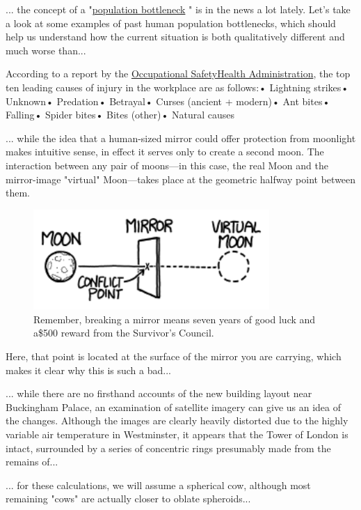 {... the concept of a "\href{https://en.wikipedia.org/wiki/Population\_bottleneck}{population bottleneck} " is in the news a lot lately. Let's take a look at some examples of past human population bottlenecks, which should help us understand how the current situation is both qualitatively different and much worse than...

According to a report by the \href{https://www.osha.gov/}{Occupational SafetyHealth Administration}, the top ten leading causes of injury in the workplace are as follows:• Lightning strikes• Unknown• Predation• Betrayal• Curses (ancient + modern)• Ant bites• Falling• Spider bites• Bites (other)• Natural causes

... while the idea that a human-sized mirror could offer protection from moonlight makes intuitive sense, in effect it serves only to create a second moon. The interaction between any pair of moons—in this case, the real Moon and the mirror-image "virtual" Moon—takes place at the geometric halfway point between them.

\begin{figure}[!htbp]
\centering
\includegraphics[scale=0.5, max width=0.8\textwidth]{imgs/a/120/moon.png}
\caption{Remember, breaking a mirror means seven years of good luck and a\$500 reward from the Survivor's Council.}
\end{figure}

Here, that point is located at the surface of the mirror you are carrying, which makes it clear why this is such a bad...

... while there are no firsthand accounts of the new building layout near Buckingham Palace, an examination of satellite imagery can give us an idea of the changes. Although the images are clearly heavily distorted due to the highly variable air temperature in Westminster, it appears that the Tower of London is intact, surrounded by a series of concentric rings presumably made from the remains of...

... for these calculations, we will assume a spherical cow, although most remaining "cows" are actually closer to oblate spheroids...

}
